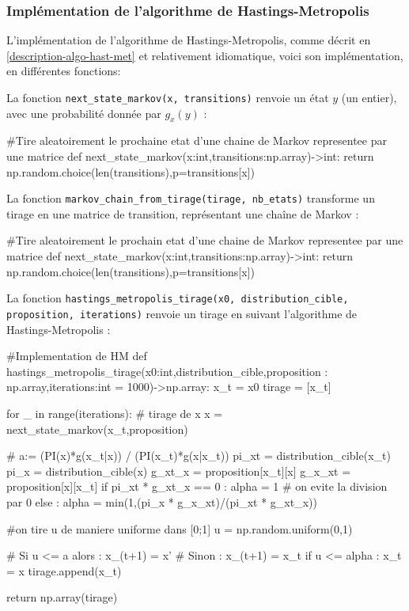 \documentclass{article}
\begin{document}
\subsubsection{Implémentation de l'algorithme de Hastings-Metropolis}

L'implémentation de l'algorithme de Hastings-Metropolis, comme décrit en \ref{description-algo-hast-met} et relativement idiomatique, voici son implémentation, en différentes fonctions: 

La fonction \texttt{next\_state\_markov(x, transitions)} renvoie un état $y$ (un entier), avec une probabilité donnée par $g_x(y)$ :

\begin{python}
#Tire aleatoirement le prochaine etat d'une chaine de Markov representee par une matrice
def next_state_markov(x:int,transitions:np.array)->int:
        return np.random.choice(len(transitions),p=transitions[x])    
\end{python}

La fonction \texttt{markov\_chain\_from\_tirage(tirage, nb\_etats)} transforme un tirage en une matrice de transition, représentant une chaîne de Markov :

\begin{python}
#Tire aleatoirement le prochain etat d'une chaine de Markov representee par une matrice
def next_state_markov(x:int,transitions:np.array)->int:
        return np.random.choice(len(transitions),p=transitions[x])
    
\end{python}

\newpage
La fonction \texttt{hastings\_metropolis\_tirage(x0, distribution\_cible, proposition, iterations)} 
renvoie un tirage en suivant l'algorithme de Hastings-Metropolis :

\begin{python}
#Implementation de HM
def hastings_metropolis_tirage(x0:int,distribution_cible,proposition : np.array,iterations:int = 1000)->np.array:
    x_t = x0
    tirage = [x_t]

    for _ in range(iterations):
        # tirage de x
        x = next_state_markov(x_t,proposition)

        # a:= (PI(x)*g(x_t|x)) / (PI(x_t)*g(x|x_t))
        pi_xt = distribution_cible(x_t)
        pi_x = distribution_cible(x)
        g_xt_x = proposition[x_t][x]
        g_x_xt = proposition[x][x_t]
        if pi_xt * g_xt_x == 0 : alpha = 1 # on evite la division par 0
        else : alpha = min(1,(pi_x * g_x_xt)/(pi_xt * g_xt_x))

        #on tire u de maniere uniforme dans [0;1]
        u = np.random.uniform(0,1)

        # Si u <= a alors : x_(t+1) = x'
        # Sinon : x_(t+1) = x_t
        if u <= alpha : x_t = x
        tirage.append(x_t)

    return np.array(tirage)
    
\end{python}
\end{document}
